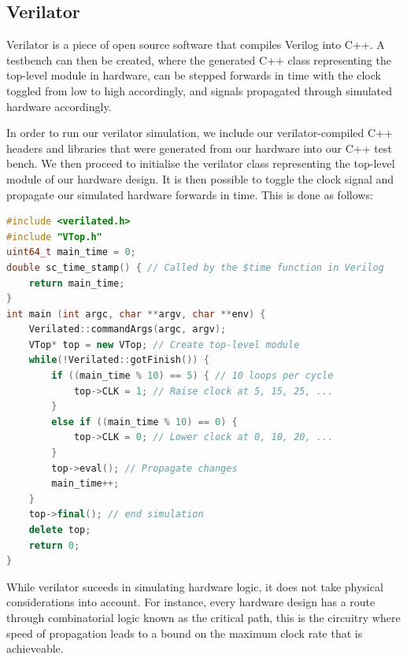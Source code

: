 \documentclass[a4paper,8pt]{report}
\begin{document}
\subsection{Verilator}
Verilator is a piece of open source software that compiles Verilog into C++. A
testbench can then be created, where the generated C++ class representing the
top-level module in hardware, can be stepped forwards in time with the clock
toggled from low to high accordingly, and signals propagated through simulated
hardware accordingly.

In order to run our verilator simulation, we include our verilator-compiled C++
headers and libraries that were generated from our hardware into our C++ test
bench. We then proceed to initialise the verilator class representing the
top-level module of our hardware design. It is then possible to toggle the clock
signal and propagate our simulated hardware forwards in time. This is done as
follows:
\begin{lstlisting}[language=C++,style=customcpp]
#include <verilated.h>
#include "VTop.h"
uint64_t main_time = 0;
double sc_time_stamp() { // Called by the $time function in Verilog
    return main_time;
}
int main (int argc, char **argv, char **env) {
    Verilated::commandArgs(argc, argv);
    VTop* top = new VTop; // Create top-level module
    while(!Verilated::gotFinish()) {
        if ((main_time % 10) == 5) { // 10 loops per cycle
            top->CLK = 1; // Raise clock at 5, 15, 25, ...
        }
        else if ((main_time % 10) == 0) {
            top->CLK = 0; // Lower clock at 0, 10, 20, ...
        }
        top->eval(); // Propagate changes
        main_time++;
    }
    top->final(); // end simulation
    delete top;
    return 0;
}

\end{lstlisting}

While verilator suceeds in simulating hardware logic, it does not take physical
considerations into account. For instance, every hardware design has a route through
combinatorial logic known as the critical path, this is the circuitry where
speed of propagation leads to a bound on the maximum clock rate that is
achieveable.

\end{document}

